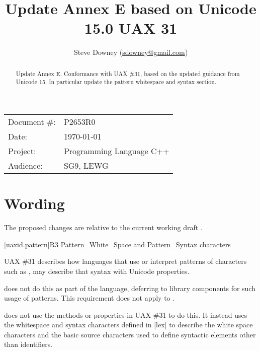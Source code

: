 \documentclass[a4paper,10pt,oneside,openany,final,article]{memoir}
\begin{document}
\title{Update Annex E based on Unicode 15.0 UAX 31}
\author{
Steve Downey \small(\href{mailto:sdowney@gmail.com}{sdowney@gmail.com}) \\
}
\date{} %
\maketitle

\begin{flushright}
\begin{tabular}{ll}
Document \#: & P2653R0 \\
Date: & \today \\
Project: & Programming Language C++ \\
Audience: & SG9, LEWG
\end{tabular}
\end{flushright}

\begin{abstract}
Update Annex E, Conformance with UAX \#31, based on the updated guidance from Unicode 15. In particular update the pattern whitespace and syntax section.
\end{abstract}

\tableofcontents*


\chapter{Wording}

The proposed changes are relative to the current working draft \cite{N4910}.

\begin{wording}


\setcounter{section}{3}
[uaxid.pattern]{R3 Pattern_White_Space and Pattern_Syntax characters}

\pnum
UAX \#31 describes how languages that use or interpret patterns of characters
such as ,
may describe that syntax with Unicode properties.

\pnum
\begin{removedblock}
\Cpp{} does not do this as part of the language,
deferring to library components for such usage of patterns.
This requirement does not apply to \Cpp{}.
\end{removedblock}
\begin{addedblock}
\Cpp{} does not use the methods or properties in UAX \#31 to do this. It instead uses the whitespace and syntax characters defined in [lex] to describe the white space characters and the basic source characters used to define syntactic elements other than identifiers.
\end{addedblock}


\end{wording}

\renewcommand{\bibname}{References}



\nocite{viewmayb27:online}
\end{document}

